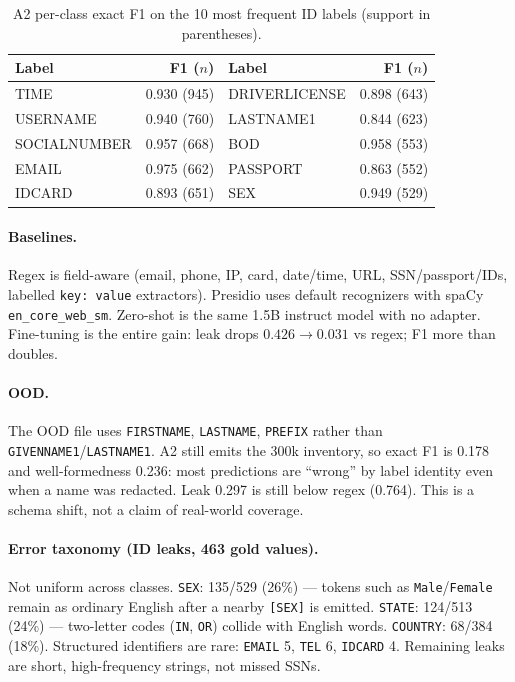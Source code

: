 \documentclass[11pt]{article}
\begin{document}
\begin{table}[t]
\centering
\caption{A2 per-class exact F1 on the 10 most frequent ID labels (support in parentheses).}
\label{tab:perclass}
\scriptsize
\setlength{\tabcolsep}{3.2pt}
\begin{tabular}{@{}l r l r@{}}
\toprule
Label & F1 ($n$) & Label & F1 ($n$) \\
\midrule
TIME & 0.930 (945) & DRIVERLICENSE & 0.898 (643) \\
USERNAME & 0.940 (760) & LASTNAME1 & 0.844 (623) \\
SOCIALNUMBER & 0.957 (668) & BOD & 0.958 (553) \\
EMAIL & 0.975 (662) & PASSPORT & 0.863 (552) \\
IDCARD & 0.893 (651) & SEX & 0.949 (529) \\
\bottomrule
\end{tabular}
\end{table}

\paragraph{Baselines.}
Regex is field-aware (email, phone, IP, card, date/time, URL, SSN/passport/IDs, labelled \texttt{key: value} extractors). Presidio uses default recognizers with spaCy \texttt{en\_core\_web\_sm}. Zero-shot is the same 1.5B instruct model with no adapter. Fine-tuning is the entire gain: leak drops $0.426{\to}0.031$ vs regex; F1 more than doubles.

\paragraph{OOD.}
The OOD file uses \texttt{FIRSTNAME}, \texttt{LASTNAME}, \texttt{PREFIX} rather than \texttt{GIVENNAME1}/\texttt{LASTNAME1}. A2 still emits the 300k inventory, so exact F1 is 0.178 and well-formedness 0.236: most predictions are ``wrong'' by label identity even when a name was redacted. Leak 0.297 is still below regex (0.764). This is a schema shift, not a claim of real-world coverage.

\paragraph{Error taxonomy (ID leaks, 463 gold values).}
Not uniform across classes. \texttt{SEX}: 135/529 (26\%) --- tokens such as \texttt{Male}/\texttt{Female} remain as ordinary English after a nearby \texttt{[SEX]} is emitted. \texttt{STATE}: 124/513 (24\%) --- two-letter codes (\texttt{IN}, \texttt{OR}) collide with English words. \texttt{COUNTRY}: 68/384 (18\%). Structured identifiers are rare: \texttt{EMAIL} 5, \texttt{TEL} 6, \texttt{IDCARD} 4. Remaining leaks are short, high-frequency strings, not missed SSNs.
\end{document}
